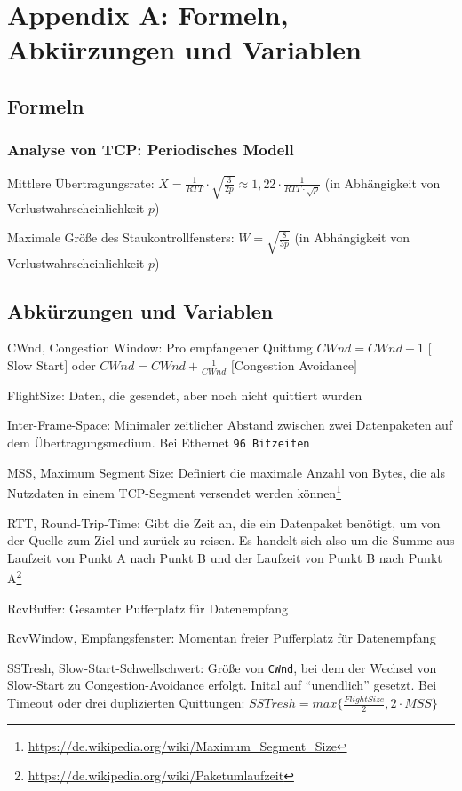 \section{Appendix A: Formeln, Abkürzungen und Variablen}

\subsection{Formeln}

\subsubsection{Analyse von TCP: Periodisches Modell}
\begin{description}
	\item{Mittlere Übertragungsrate}: \(X = \frac{1}{RTT} \cdot \sqrt{\frac{3}{2p}} \approx 1,22 \cdot \frac{1}{RTT \cdot \sqrt{p}}\) (in Abhängigkeit von Verlustwahrscheinlichkeit \(p\))
	\item{Maximale Größe des Staukontrollfensters}: \(W = \sqrt{\frac{8}{3p}}\) (in Abhängigkeit von Verlustwahrscheinlichkeit \(p\))
\end{description}


\subsection{Abkürzungen und Variablen}
\begin{description}
	\item{CWnd, Congestion Window}: Pro empfangener Quittung \(CWnd = CWnd + 1\) \(\big\lbrack\)Slow Start\(\big\rbrack\) oder \(CWnd = CWnd + \frac{1}{CWnd}\) \(\big\lbrack\)Congestion Avoidance\(\big\rbrack\)
	\item{FlightSize}: Daten, die gesendet, aber noch nicht quittiert wurden
	\item{Inter-Frame-Space}: Minimaler zeitlicher Abstand zwischen zwei Datenpaketen auf dem Übertragungsmedium. Bei Ethernet \texttt{96 Bitzeiten}
	\item{MSS, Maximum Segment Size}: Definiert die maximale Anzahl von Bytes, die als Nutzdaten in einem TCP-Segment versendet werden können\footnote{\url{https://de.wikipedia.org/wiki/Maximum\_Segment\_Size}}
	\item{RTT, Round-Trip-Time}: Gibt die Zeit an, die ein Datenpaket benötigt, um von der Quelle zum Ziel und zurück zu reisen. Es handelt sich also um die Summe aus Laufzeit von Punkt A nach Punkt B und der Laufzeit von Punkt B nach Punkt A\footnote{\url{https://de.wikipedia.org/wiki/Paketumlaufzeit}}
	\item{RcvBuffer}: Gesamter Pufferplatz für Datenempfang
	\item{RcvWindow, Empfangsfenster}: Momentan freier Pufferplatz für Datenempfang
	\item{SSTresh, Slow-Start-Schwellschwert}: Größe von \texttt{CWnd}, bei dem der Wechsel von Slow-Start zu Congestion-Avoidance erfolgt. Inital auf "`unendlich"' gesetzt. Bei Timeout oder drei duplizierten Quittungen: \(SSTresh = max\big\{\frac{FlightSize}{2}, 2 \cdot MSS\big\}\)
\end{description}